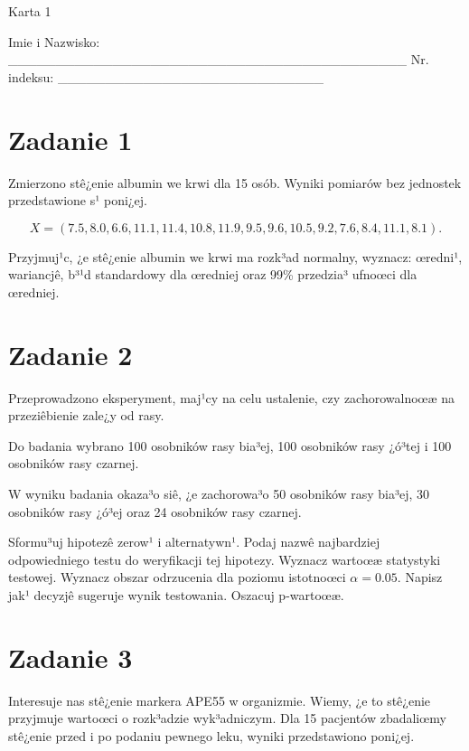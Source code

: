 \documentclass[a4paper,12pt]{article}
\begin{document}
 Karta  1  

 Imie i Nazwisko: \_\_\_\_\_\_\_\_\_\_\_\_\_\_\_\_\_\_\_\_\_\_\_\_\_\_\_\_\_\_\_\_\_\_\_\_\_\_\_\_\_\_ Nr. indeksu: \_\_\_\_\_\_\_\_\_\_\_\_\_\_\_\_\_\_\_\_\_\_\_\_\_\_\_\_ 
 \section*{Zadanie 1}
     
     Zmierzono stê¿enie albumin we krwi dla 15 osób. 
     Wyniki pomiarów bez jednostek przedstawione s¹ poni¿ej. 
     
     \noindent $$X=(  7.5,  8.0,  6.6, 11.1, 11.4, 10.8, 11.9,  9.5,  9.6, 10.5,  9.2,  7.6,  8.4, 11.1,  8.1 ).$$
     
     Przyjmuj¹c, ¿e stê¿enie albumin we krwi ma rozk³ad normalny, 
     wyznacz: œredni¹, wariancjê, b³¹d standardowy dla œredniej oraz 99\% przedzia³ ufnoœci dla œredniej. \vspace{1cm} 

  \section*{Zadanie 2}
     
  Przeprowadzono eksperyment, maj¹cy na celu ustalenie, czy zachorowalnoœæ na przeziêbienie zale¿y od rasy.
  
  Do badania wybrano 100 osobników rasy bia³ej, 100 osobników rasy ¿ó³tej i 100 osobników rasy czarnej. 
  
  W wyniku badania okaza³o siê, ¿e zachorowa³o 50 osobników rasy bia³ej, 30 osobników rasy ¿ó³ej oraz 24 osobników rasy czarnej. 
  
  Sformu³uj hipotezê zerow¹ i alternatywn¹. 
  Podaj nazwê najbardziej odpowiedniego testu do weryfikacji tej hipotezy. 
  Wyznacz wartoœæ statystyki testowej. 
  Wyznacz obszar odrzucenia dla poziomu istotnoœci $\alpha=0.05$. 
  Napisz jak¹ decyzjê sugeruje wynik testowania. Oszacuj p-wartoœæ. \vspace{1cm} 

  \section*{Zadanie 3}
     
  Interesuje nas stê¿enie markera APE55  w organizmie. 
  Wiemy, ¿e to stê¿enie przyjmuje wartoœci o rozk³adzie wyk³adniczym. 
  Dla 15 pacjentów zbadaliœmy stê¿enie przed i po podaniu pewnego leku, 
  wyniki przedstawiono poni¿ej.
  
\end{document}

